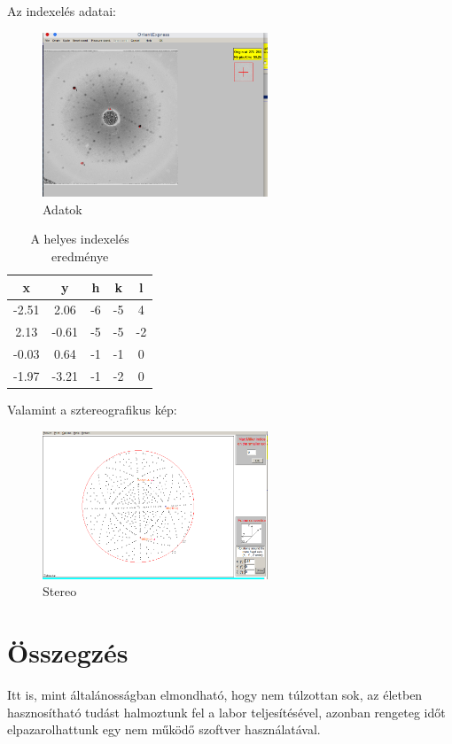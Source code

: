 \documentclass[a4paper,12pt]{article}
\begin{document}
\par Az indexelés adatai:

\begin{figure}[H]
	\centering
	\includegraphics[width=0.6\textwidth]{./valid_indexation/zafir-coords.png}
	\caption{Adatok}
\end{figure}

\begin{table}[H]
	\centering
	\begin{tabular}{|c|c||c|c|c|}  \hline
		x     & y     & h  & k  & l  \\ \hline
		-2.51 & 2.06 & -6 & -5 & 4 \\ \hline
		2.13  & -0.61  & -5  & -5 & -2  \\ \hline
		-0.03 & 0.64  & -1  & -1 & 0 \\ \hline
		-1.97 & -3.21 & -1 & -2 & 0  \\ \hline
	\end{tabular}
	\caption{A helyes indexelés eredménye}
\end{table}

\par Valamint a sztereografikus kép:

\begin{figure}[H]
	\centering
	\includegraphics[width=0.6\textwidth]{./valid_indexation/Zafir-stereo.png}
	\caption{Stereo}
\end{figure}

\section{ Összegzés}

\par Itt is, mint általánosságban elmondható, hogy nem túlzottan sok, az életben
hasznosítható tudást halmoztunk fel a labor teljesítésével, azonban rengeteg időt
elpazarolhattunk egy nem működő szoftver használatával.
\end{document}
